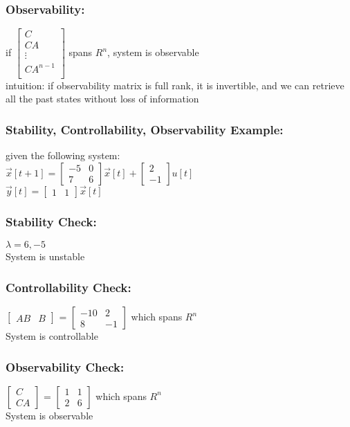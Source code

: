 \begin{frame}
\frametitle{Observability:} 

if 
$\begin{bmatrix}
C \\
CA \\
\vdots \\
CA^{n-1} \\
\end{bmatrix}$
spans $R^{n}$, system is observable \\
intuition: if observability matrix is full rank, it is invertible, and we can retrieve all the past states without loss of information \\
\end{frame}

\begin{frame}
\frametitle{Stability, Controllability, Observability Example:}

given the following system: \\
$\vec{x}[t+1] = 
\begin{bmatrix}
-5 & 0 \\
7 & 6
\end{bmatrix}
\vec{x}[t] + 
\begin{bmatrix}
2 \\
-1
\end{bmatrix}
u[t]$\\
$
\vec{y}[t] =
\begin{bmatrix}
1 & 1
\end{bmatrix}
\vec{x}[t]$
\end{frame}

\begin{frame}
\frametitle{Stability Check:}

$\lambda = 6, -5$\\ \pause
System is unstable
\end{frame}

\begin{frame}
\frametitle{Controllability Check:}

$\begin{bmatrix}
AB & B
\end{bmatrix}$ = 
$\begin{bmatrix}
-10 & 2 \\
8 & -1
\end{bmatrix}$
which spans $R^{n}$ \\ \pause
System is controllable
\end{frame}

\begin{frame}
\frametitle{Observability Check:}

$\begin{bmatrix}
C \\
CA
\end{bmatrix}$ = 
$\begin{bmatrix}
1 & 1 \\
2 & 6
\end{bmatrix}$ 
which spans $R^{n}$ \\ \pause
System is observable
\end{frame}

